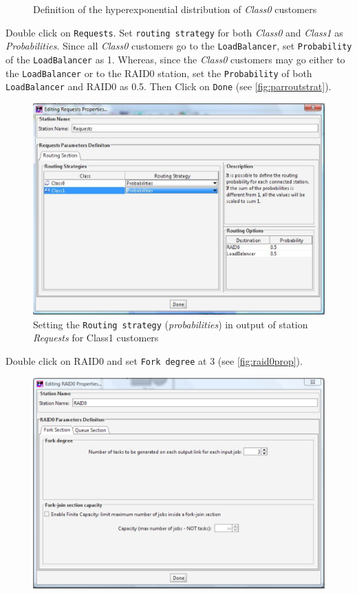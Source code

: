 \begin{itemize*}
\begin{figure}[htb]
    \caption{Definition of the hyperexponential distribution
    of \emph{Class0} customers}
    \label{fig:hypeexponcl0}
\end{figure}
\item Double click on \texttt{Requests}. Set \texttt{routing
strategy} for both \emph{Class0} and \emph{Class1} as
\emph{Probabilities}. Since all \emph{Class0} customers go to the
\texttt{LoadBalancer}, set \texttt{Probability} of the
\texttt{LoadBalancer} as 1. Whereas, since the \emph{Class0}
customers may go either to the \texttt{LoadBalancer} or to the
RAID0 station, set the \texttt{Probability} of both
\texttt{LoadBalancer} and RAID0 as 0.5. Then Click on
\texttt{Done} (see \autoref{fig:parroutstrat}).
\begin{figure}[htb]
    \begin{center}
        \includegraphics[scale=.5]{img/jsimg/12.19.eps}
    \end{center}
    \caption{Setting the \texttt{Routing strategy} (\emph{probabilities}) in output
    of station \emph{Requests} for Class1 customers}
    \label{fig:parroutstrat}
\end{figure}
\item Double click on RAID0 and set \texttt{Fork degree} at 3 (see
\autoref{fig:raid0prop}).
\begin{figure}[htb]
    \begin{center}
        \includegraphics[scale=.5]{img/jsimg/12.20.eps}

\end{center}
\end{figure}
\end{itemize*}
